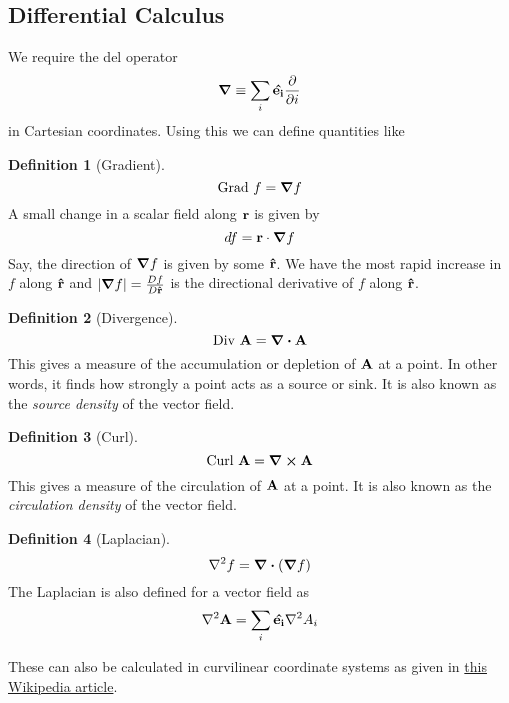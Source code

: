 \documentclass[10pt, a4paper]{extarticle}
\theoremstyle{definition}
\newtheorem{defn}{Definition}
\begin{document}
\subsection{Differential Calculus}
We require the del operator
\[\grad\equiv \sum_i\vu{e_i}\pdv{}{i}\] in Cartesian coordinates. Using this we can define quantities like
\begin{framed}
	\begin{defn}[Gradient]
		\[\text{Grad }f=\grad f\]
		A small change in a scalar field along $\vb{r}$ is given by
		\[df=\vb{r}\cdot\grad f\]
		Say, the direction of $\grad f$ is given by some $\vu{r}$. We have the most rapid increase in $f$ along $\vu{r}$ and $|\grad f|=\frac{Df}{D\vu{r}}$ is the directional derivative of $f$ along $\vu{r}$.
	\end{defn}

	\begin{defn}[Divergence]
		\[\text{Div }\vb{A}=\div\vb{A}\]
		This gives a measure of the accumulation or depletion of $\vb{A}$ at a point. In other words, it finds how strongly a point acts as a source or sink. It is also known as the \emph{source density} of the vector field.
	\end{defn}

	\begin{defn}[Curl]
		\[\text{Curl }\vb{A}=\curl\vb{A}\]
		This gives a measure of the circulation of $\vb{A}$ at a point. It is also known as the \emph{circulation density} of the vector field.
	\end{defn}

	\begin{defn}[Laplacian]
		\[\laplacian f=\div(\grad f)\]
		The Laplacian is also defined for a vector field as
		\[\laplacian\vb{A}=\sum_i \vu{e_i}\laplacian A_i\]
	\end{defn}
\end{framed}
These can also be calculated in curvilinear coordinate systems as given in \href{https://en.wikipedia.org/wiki/Del_in_cylindrical_and_spherical_coordinates}{this Wikipedia article}. 
\end{document}
